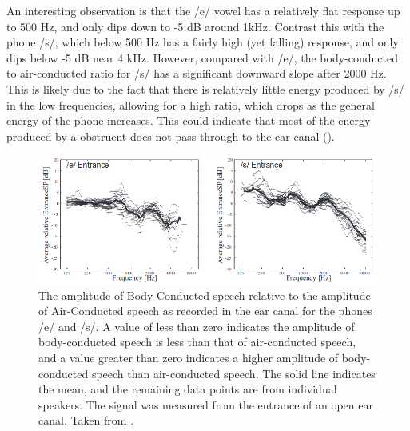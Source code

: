 \documentclass[dissertation,copyright]{uathesis}
\begin{document}
An interesting observation is that the /e/ vowel has a relatively flat response up to 500 Hz, and only dips down to -5 dB around 1kHz.  Contrast this with the phone /s/, which below 500 Hz has a fairly high (yet falling) response, and only dips below -5 dB near 4 kHz.  However, compared with /e/, the body-conducted to air-conducted ratio for /s/ has a significant downward slope after 2000 Hz.  This is likely due to the fact that there is relatively little energy produced by /s/ in the low frequencies, allowing for a high ratio, which drops as the general energy of the phone increases.  This could indicate that most of the energy produced by a obstruent does not pass through to the ear canal (\cite{reinfeldt:10}).
\begin{figure}
\includegraphics[width=1\textwidth]{figure/BCrelAC_e_s.png}
\caption{The amplitude of Body-Conducted speech relative to the amplitude of Air-Conducted  speech as recorded in the ear canal for the phones /e/ and /s/.  A value of less than zero indicates the amplitude of body-conducted speech is less than that of air-conducted speech, and a value greater than zero indicates a higher amplitude of body-conducted speech than air-conducted speech. The solid line indicates the mean, and the remaining data points are from individual speakers.  The signal was measured from the entrance of an open ear canal.  Taken from \cite{reinfeldt:10}.}
\label{BCrelAC}
\end{figure}
\end{document}
